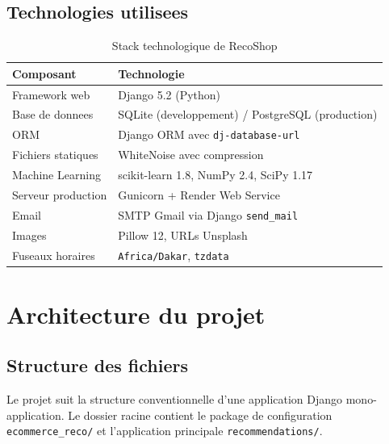 \documentclass[12pt,a4paper]{report}
\newcommand{\fichier}[1]{\texttt{#1}}
\begin{document}
\section{Technologies utilisees}

\begin{table}[h]
\centering
\begin{tabularx}{\linewidth}{@{}lX@{}}
\toprule
\textbf{Composant} & \textbf{Technologie} \\
\midrule
Framework web       & Django 5.2 (Python) \\
Base de donnees     & SQLite (developpement) / PostgreSQL (production) \\
ORM                 & Django ORM avec \texttt{dj-database-url} \\
Fichiers statiques  & WhiteNoise avec compression \\
Machine Learning    & scikit-learn 1.8, NumPy 2.4, SciPy 1.17 \\
Serveur production  & Gunicorn + Render Web Service \\
Email               & SMTP Gmail via Django \texttt{send\_mail} \\
Images              & Pillow 12, URLs Unsplash \\
Fuseaux horaires    & \texttt{Africa/Dakar}, \texttt{tzdata} \\
\bottomrule
\end{tabularx}
\caption{Stack technologique de RecoShop}
\end{table}

\chapter{Architecture du projet}

\section{Structure des fichiers}

Le projet suit la structure conventionnelle d'une application Django
mono-application. Le dossier racine contient le package de configuration
\fichier{ecommerce\_reco/} et l'application principale \fichier{recommendations/}.
\end{document}

